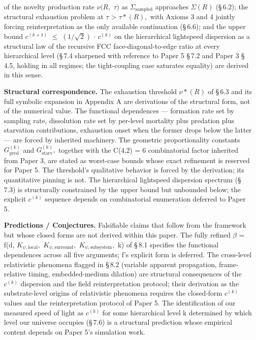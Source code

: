 \documentclass[11pt,oneside]{report}
\theoremstyle{definition}
\theoremstyle{remark}
\begin{document}
of the novelty production rate \ensuremath{\nu (R,} \ensuremath{\tau )} as \ensuremath{\Sigma_{\mathrm{sampled}}} approaches \ensuremath{\Sigma (R)}
(\S\,6.2); the structural exhaustion problem at \ensuremath{\tau} \textgreater{} \ensuremath{\tau *(R),}
with Axioms 3 and 4 jointly forcing reinterpretation as the only
available continuation (\S\,6.6); and the upper bound \ensuremath{c^{(k+1)}} \ensuremath{\leq} \ensuremath{(1/\sqrt{2})} \ensuremath{\cdot}
\ensuremath{c^{(k)}} on the hierarchical lightspeed dispersion as a structural law
of the recursive FCC face-diagonal-to-edge ratio at every hierarchical
level (\S\,7.4 sharpened with reference to Paper 5 \S\,7.2 and Paper 3 \S\,4.5,
holding in all regimes; the tight-coupling case saturates equality) are
derived in this sense.

\textbf{Structural correspondence.} The exhaustion threshold \ensuremath{\nu *(R)} of
\S\,6.3 and its full symbolic expansion in Appendix A are derivations of
the structural form, not of the numerical value. The functional
dependences --- formation rate set by sampling rate, dissolution rate
set by per-level mortality plus predation plus starvation contributions,
exhaustion onset when the former drops below the latter --- are forced
by inherited machinery. The geometric proportionality constants
\ensuremath{G_{\mathrm{pred}}^{(k)}} and \ensuremath{G_{\mathrm{starv}}^{(k)},} together with the C(4,2) = 6
combinatorial factor inherited from Paper 3, are stated as worst-case
bounds whose exact refinement is reserved for Paper 5. The threshold's
qualitative behavior is forced by the derivation; its quantitative
pinning is not. The hierarchical lightspeed dispersion spectrum (\S\,7.3)
is structurally constrained by the upper bound but unbounded below; the
explicit \ensuremath{c^{(k)}} sequence depends on combinatorial enumeration deferred
to Paper 5.

\textbf{Predictions / Conjectures.} Falsifiable claims that follow from
the framework but whose closed forms are not derived within this paper.
The fully refined \ensuremath{\beta} = f(d, \ensuremath{K_{\psi,\mathrm{local}},} \ensuremath{K_{\psi,\mathrm{surround}},} \ensuremath{K_{\psi,\mathrm{subsystem}},}
k) of \S\,8.1 specifies the functional dependences across all five
arguments; f's explicit form is deferred. The cross-level relativistic
phenomena flagged in \S\,8.2 (variable apparent propagation, frame-relative
timing, embedded-medium dilation) are structural consequences of the
\ensuremath{c^{(k)}} dispersion and the field reinterpretation protocol; their
derivation as the substrate-level origins of relativistic phenomena
requires the closed-form \ensuremath{c^{(k)}} values and the reinterpretation
protocol of Paper 5. The identification of our measured speed of light
as \ensuremath{c^{(k)}} for some hierarchical level k determined by which level our
universe occupies (\S\,7.6) is a structural prediction whose empirical
content depends on Paper 5's simulation work.
\end{document}
